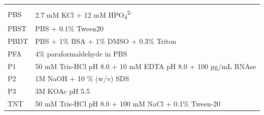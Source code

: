 \documentclass[11pt,singlespacinge,twoside]{reedthesis} %
\theoremstyle{definition}
\theoremstyle{definition}
\theoremstyle{definition}
\theoremstyle{remark}
\begin{document}
\begin{longtable}[]{@{}ll@{}}
\begin{minipage}[t]{0.71\columnwidth}
\end{minipage}\tabularnewline
\begin{minipage}[t]{0.23\columnwidth}\raggedright
PBS\strut
\end{minipage} & \begin{minipage}[t]{0.71\columnwidth}\raggedright
2.7 mM KCl + 12 mM HPO\textsubscript{4}\textsuperscript{2-}\strut
\end{minipage}\tabularnewline
\begin{minipage}[t]{0.23\columnwidth}\raggedright
PBST\strut
\end{minipage} & \begin{minipage}[t]{0.71\columnwidth}\raggedright
PBS + 0.1\% Tween20\strut
\end{minipage}\tabularnewline
\begin{minipage}[t]{0.23\columnwidth}\raggedright
PBDT\strut
\end{minipage} & \begin{minipage}[t]{0.71\columnwidth}\raggedright
PBS + 1\% BSA + 1\% DMSO + 0.3\% Triton\strut
\end{minipage}\tabularnewline
\begin{minipage}[t]{0.23\columnwidth}\raggedright
PFA\strut
\end{minipage} & \begin{minipage}[t]{0.71\columnwidth}\raggedright
4\% paraformaldehyde in PBS\strut
\end{minipage}\tabularnewline
\begin{minipage}[t]{0.23\columnwidth}\raggedright
P1\strut
\end{minipage} & \begin{minipage}[t]{0.71\columnwidth}\raggedright
50 mM Tris-HCl pH 8.0 + 10 mM EDTA pH 8.0 + 100 µg/mL RNAse\strut
\end{minipage}\tabularnewline
\begin{minipage}[t]{0.23\columnwidth}\raggedright
P2\strut
\end{minipage} & \begin{minipage}[t]{0.71\columnwidth}\raggedright
1M NaOH + 10 \% (w/v) SDS\strut
\end{minipage}\tabularnewline
\begin{minipage}[t]{0.23\columnwidth}\raggedright
P3\strut
\end{minipage} & \begin{minipage}[t]{0.71\columnwidth}\raggedright
3M KOAc pH 5.5\strut
\end{minipage}\tabularnewline
\begin{minipage}[t]{0.23\columnwidth}\raggedright
TNT\strut
\end{minipage} & \begin{minipage}[t]{0.71\columnwidth}\raggedright
50 mM Tris-HCl pH 8.0 + 100 mM NaCl + 0.1\% Tween-20\strut
\end{minipage}\tabularnewline
\bottomrule
\end{longtable}
\end{document}
